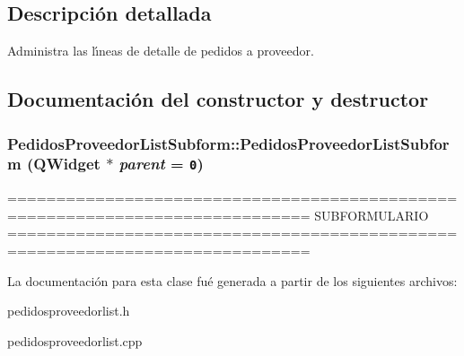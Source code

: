 \subsection{Descripci\'{o}n detallada}
Administra las l\'{\i}neas de detalle de pedidos a proveedor. 



\subsection{Documentaci\'{o}n del constructor y destructor}
\subsubsection{\setlength{\rightskip}{0pt plus 5cm}Pedidos\-Proveedor\-List\-Subform::Pedidos\-Proveedor\-List\-Subform (QWidget $\ast$ {\em parent} = {\tt 0})}\label{classPedidosProveedorListSubform_a2}


============================================================================= SUBFORMULARIO ============================================================================= 

La documentaci\'{o}n para esta clase fu\'{e} generada a partir de los siguientes archivos:\begin{CompactItemize}
\item 
pedidosproveedorlist.h\item 
pedidosproveedorlist.cpp\end{CompactItemize}
